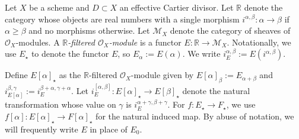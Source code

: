\begin{definition}
\notready
	\label{definition:filtered-O_X-module}
	Let $X$ be a scheme and $D \subset X$ an effective Cartier divisor.
	Let $\mathbb R$ denote the category whose objects are real numbers with
	a single morphism $i^{\alpha,\beta}:\alpha\to\beta$ if $\alpha \geq \beta$ and no
	morphisms otherwise.
	Let $\mathscr M_X$ denote the category of sheaves of $\mathscr{O}_X$-modules.
A {\em $\mathbb R$-filtered $\mathscr O_X$-module} is a functor $E: \mathbb R \to \mathscr M_X$.
Notationally, we use $E_\star$ to denote the functor $E$, so $E_\alpha := E(\alpha)$.
We write $i_E^{\alpha,\beta} := E(i^{\alpha,\beta})$.
\end{definition}
\begin{example}
\notready
	\label{example:}
	Define $E[\alpha]_\star$ as the $\mathbb{R}$-filtered $\mathscr O_X$-module given by
$E[\alpha]_\beta := E_{\alpha + \beta}$
and $i^{\beta,\gamma}_{E[\alpha]} := i_E^{\beta + \alpha, \gamma + \alpha}$.
Let $i^{[\alpha,\beta]}_E : E[\alpha]_\star \to E[\beta]_\star$ denote the
natural transformation whose value on $\gamma$ is $i_E^{\alpha + \gamma, \beta +
\gamma}$.
For $f: E_\star \to F_\star$, we use $f[\alpha] : E[\alpha]_\star \to F[\alpha]_\star$ for
the natural induced map.
By abuse of notation, we will frequently write $E$ in place of $E_0$.
\end{example}
